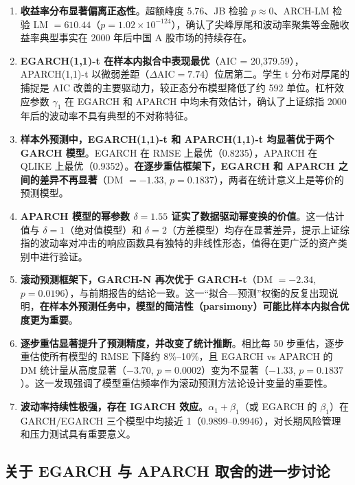 \documentclass[12pt,a4paper]{article}
\begin{document}
\begin{enumerate}[nosep,label=(\arabic*)]
    \item \textbf{收益率分布显著偏离正态性}。超额峰度 5.76、JB 检验 $p \approx 0$、ARCH-LM 检验 LM $= 610.44$（$p = 1.02\times10^{-124}$），确认了尖峰厚尾和波动率聚集等金融收益率典型事实在 2000 年后中国 A 股市场的持续存在。

    \item \textbf{EGARCH(1,1)-t 在样本内拟合中表现最优}（AIC = 20{,}379.59），APARCH(1,1)-t 以微弱差距（$\Delta\mathrm{AIC} = 7.74$）位居第二。学生 t 分布对厚尾的捕捉是 AIC 改善的主要驱动力，较正态分布模型降低了约 592 单位。杠杆效应参数 $\gamma_1$ 在 EGARCH 和 APARCH 中均未有效估计，确认了上证综指 2000 年后的波动率不具有典型的不对称特征。

    \item \textbf{样本外预测中，EGARCH(1,1)-t 和 APARCH(1,1)-t 均显著优于两个 GARCH 模型}。EGARCH 在 RMSE 上最优（0.8235），APARCH 在 QLIKE 上最优（0.9352）。\textbf{在逐步重估框架下，EGARCH 和 APARCH 之间的差异不再显著}（DM $=-1.33$, $p=0.1837$），两者在统计意义上是等价的预测模型。

    \item \textbf{APARCH 模型的幂参数 $\delta = 1.55$ 证实了数据驱动幂变换的价值}。这一估计值与 $\delta = 1$（绝对值模型）和 $\delta = 2$（方差模型）均存在显著差异，提示上证综指的波动率对冲击的响应函数具有独特的非线性形态，值得在更广泛的资产类别中进行验证。

    \item \textbf{滚动预测框架下，GARCH-N 再次优于 GARCH-t}（DM $=-2.34$, $p=0.0196$），与前期报告的结论一致。这一``拟合—预测''权衡的反复出现说明，\textbf{在样本外预测任务中，模型的简洁性（parsimony）可能比样本内拟合优度更为重要}。

    \item \textbf{逐步重估显著提升了预测精度，并改变了统计推断}。相比每 50 步重估，逐步重估使所有模型的 RMSE 下降约 8\%--10\%，且 EGARCH vs APARCH 的 DM 统计量从高度显著（$-3.70$, $p=0.0002$）变为不显著（$-1.33$, $p=0.1837$）。这一发现强调了模型重估频率作为滚动预测方法论设计变量的重要性。

    \item \textbf{波动率持续性极强，存在 IGARCH 效应}。$\alpha_1 + \beta_1$（或 EGARCH 的 $\beta_1$）在 GARCH/EGARCH 三个模型中均接近 1（0.9899--0.9946），对长期风险管理和压力测试具有重要意义。
\end{enumerate}

\subsection{关于 EGARCH 与 APARCH 取舍的进一步讨论}
\end{document}
